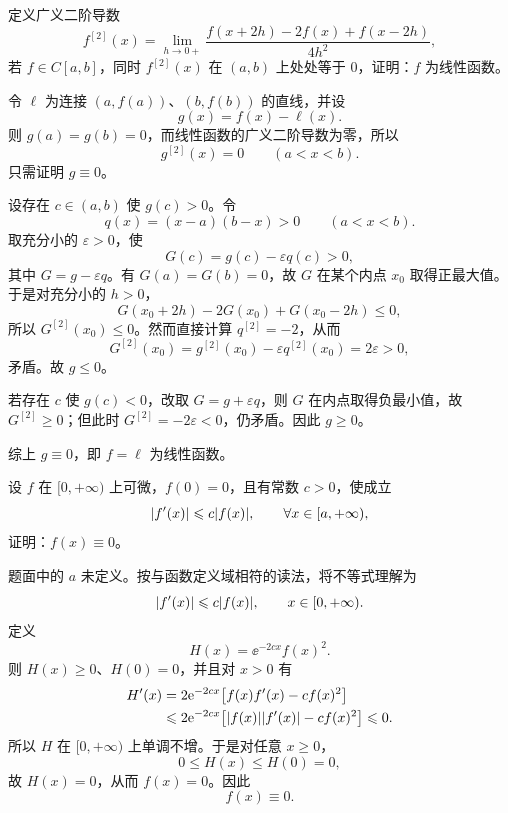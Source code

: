 \begin{xreferenceproblem}[10（Schwarz 定理）]
定义广义二阶导数
\[
  f^{[2]}(x)=\lim_{h\to0+}\frac{f(x+2h)-2f(x)+f(x-2h)}{4h^2},
\]
若 $f\in C[a,b]$，同时 $f^{[2]}(x)$ 在 $(a,b)$ 上处处等于 0，证明：$f$ 为线性函数。
\end{xreferenceproblem}
\begin{xsolution}
令 $\ell$ 为连接 $(a,f(a))$、$(b,f(b))$ 的直线，并设
\[
  g(x)=f(x)-\ell(x).
\]
则 $g(a)=g(b)=0$，而线性函数的广义二阶导数为零，所以
\[
  g^{[2]}(x)=0\qquad(a<x<b).
\]
只需证明 $g\equiv0$。

设存在 $c\in(a,b)$ 使 $g(c)>0$。令
\[
  q(x)=(x-a)(b-x)>0\qquad(a<x<b).
\]
取充分小的 $\varepsilon>0$，使
\[
  G(c)=g(c)-\varepsilon q(c)>0,
\]
其中 $G=g-\varepsilon q$。有 $G(a)=G(b)=0$，故 $G$ 在某个内点 $x_0$ 取得正最大值。于是对充分小的 $h>0$，
\[
  G(x_0+2h)-2G(x_0)+G(x_0-2h)\leqslant0,
\]
所以 $G^{[2]}(x_0)\leqslant0$。然而直接计算 $q^{[2]}=-2$，从而
\[
  G^{[2]}(x_0)=g^{[2]}(x_0)-\varepsilon q^{[2]}(x_0)=2\varepsilon>0,
\]
矛盾。故 $g\leqslant0$。

若存在 $c$ 使 $g(c)<0$，改取 $G=g+\varepsilon q$，则 $G$ 在内点取得负最小值，故 $G^{[2]}\geqslant0$；但此时 $G^{[2]}=-2\varepsilon<0$，仍矛盾。因此 $g\geqslant0$。

综上 $g\equiv0$，即 $f=\ell$ 为线性函数。
\end{xsolution}


\begin{xreferenceproblem}
设 $f$ 在 $[0,+\infty)$ 上可微，$f(0)=0$，且有常数 $c>0$，使成立
\[
  \lvert f'(x)\rvert\leqslant c\lvert f(x)\rvert,\qquad \forall x\in[a,+\infty),
\]
证明：$f(x)\equiv0$。
\end{xreferenceproblem}
\begin{xsolution}
题面中的 $a$ 未定义。按与函数定义域相符的读法，将不等式理解为
\[
  \lvert f'(x)\rvert\leqslant c\lvert f(x)\rvert,
  \qquad x\in[0,+\infty).
\]
定义
\[
  H(x)=\ee^{-2cx}f(x)^2.
\]
则 $H(x)\geqslant0$、$H(0)=0$，并且对 $x>0$ 有
\[
  \begin{aligned}
  H'(x)
  &=2\mathrm{e}^{-2cx}\bigl[f(x)f'(x)-c f(x)^2\bigr]\\
  &\leqslant2\mathrm{e}^{-2cx}
    \bigl[\lvert f(x)\rvert\lvert f'(x)\rvert-c f(x)^2\bigr]
  \leqslant0.
  \end{aligned}
\]
所以 $H$ 在 $[0,+\infty)$ 上单调不增。于是对任意 $x\geqslant0$，
\[
  0\leqslant H(x)\leqslant H(0)=0,
\]
故 $H(x)=0$，从而 $f(x)=0$。因此
\[
  f(x)\equiv0.
\]
\end{xsolution}


